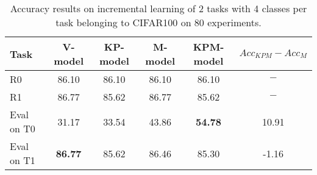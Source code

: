 \begin{table}[H]
\centering
\begin{tabular}{lccccc}
\toprule
Task  & V-model & KP-model & M-model & KPM-model & $Acc_{KPM}-Acc_{M}$ \\
\midrule
R0 & 86.10 & 86.10 & 86.10 & 86.10 & $-$ \\
R1 & 86.77 & 85.62 & 86.77 & 85.62 & $-$ \\

 \hline 
Eval on T0 & 31.17 & 33.54 & 43.86 & \textbf{54.78} & 10.91 \\
Eval on T1 & \textbf{86.77} & 85.62 & 86.46 & 85.30 & -1.16 \\
\bottomrule
\end{tabular}
\caption{Accuracy results on incremental learning of 2 tasks with 4 classes per task belonging to CIFAR100 on 80 experiments.}
\end{table}
